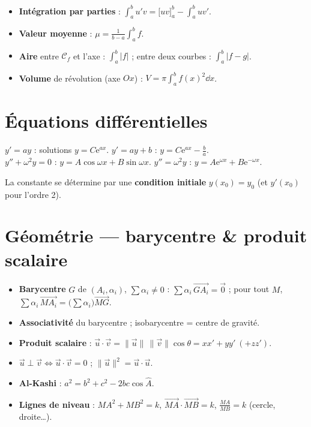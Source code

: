 \begin{itemize}
\item \textbf{Intégration par parties} : $\displaystyle\int_a^b u'v=\big[uv\big]_a^b-\int_a^b uv'$.
\item \textbf{Valeur moyenne} : $\mu=\frac1{b-a}\int_a^b f$.
\item \textbf{Aire} entre $\mathcal C_f$ et l'axe : $\int_a^b|f|$ ; entre deux courbes : $\int_a^b|f-g|$.
\item \textbf{Volume} de révolution (axe $Ox$) : $V=\pi\int_a^b f(x)^2\dd x$.
\end{itemize}

\section{Équations différentielles}

\begin{aretenir}
$y'=ay$ : solutions $y=C\mathrm{e}^{ax}$. \quad $y'=ay+b$ : $y=C\mathrm{e}^{ax}-\frac ba$.\\
$y''+\omega^2 y=0$ : $y=A\cos\omega x+B\sin\omega x$. \quad $y''=\omega^2 y$ : $y=A\mathrm{e}^{\omega x}+B\mathrm{e}^{-\omega x}$.
\end{aretenir}
La constante se détermine par une \textbf{condition initiale} $y(x_0)=y_0$ (et $y'(x_0)$ pour l'ordre 2).

\section{Géométrie — barycentre \& produit scalaire}

\begin{itemize}
\item \textbf{Barycentre} $G$ de $(A_i,\alpha_i)$, $\sum\alpha_i\ne0$ : $\sum\alpha_i\,\vec{GA_i}=\vec0$ ;
      pour tout $M$, $\sum\alpha_i\,\vec{MA_i}=\big(\sum\alpha_i\big)\vec{MG}$.
\item \textbf{Associativité} du barycentre ; isobarycentre = centre de gravité.
\item \textbf{Produit scalaire} : $\vec u\cdot\vec v=\|\vec u\|\,\|\vec v\|\cos\theta=x x'+y y'\ (+zz')$.
\item $\vec u\perp\vec v\iff\vec u\cdot\vec v=0$ ; $\|\vec u\|^2=\vec u\cdot\vec u$.
\item \textbf{Al-Kashi} : $a^2=b^2+c^2-2bc\cos\widehat A$.
\item \textbf{Lignes de niveau} : $MA^2+MB^2=k$, $\vec{MA}\cdot\vec{MB}=k$, $\frac{MA}{MB}=k$ (cercle, droite…).
\end{itemize}

